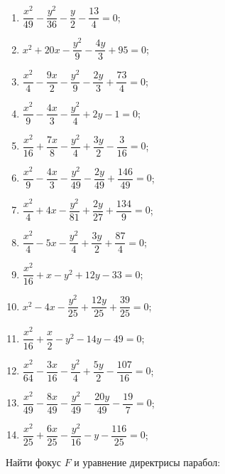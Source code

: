 	\begin{multicols}{2}
		\begin{enumerate}
			\setcounter{enumi}{\value{tasks}}

				\item \( \dfrac{x^2}{49} - \dfrac{y^2}{36} - \dfrac{y}{2} - \dfrac{13}{4} = 0 \);
				\item \( x^2 + 20 x - \dfrac{y^2}{9} - \dfrac{4 y}{3} + 95 = 0 \);
				\item \( \dfrac{x^2}{4} - \dfrac{9 x}{2} - \dfrac{y^2}{9} - \dfrac{2 y}{3} + \dfrac{73}{4} = 0 \);
				\item \( \dfrac{x^2}{9} - \dfrac{4 x}{3} - \dfrac{y^2}{4} + 2 y - 1 = 0 \);
				\item \( \dfrac{x^2}{16} + \dfrac{7 x}{8} - \dfrac{y^2}{4} + \dfrac{3 y}{2} - \dfrac{3}{16} = 0 \);
				\item \( \dfrac{x^2}{9} - \dfrac{4 x}{3} - \dfrac{y^2}{49} - \dfrac{2 y}{49} + \dfrac{146}{49} = 0 \);
				\item \( \dfrac{x^2}{4} + 4 x - \dfrac{y^2}{81} + \dfrac{2 y}{27} + \dfrac{134}{9} = 0 \);
				\item \( \dfrac{x^2}{4} - 5 x - \dfrac{y^2}{4} + \dfrac{3 y}{2} + \dfrac{87}{4} = 0 \);
				\item \( \dfrac{x^2}{16} + x - y^2 + 12 y - 33 = 0 \);
				\item \( x^2 - 4 x - \dfrac{y^2}{25} + \dfrac{12 y}{25} + \dfrac{39}{25} = 0 \);
				\item \( \dfrac{x^2}{16} + \dfrac{x}{2} - y^2 - 14 y - 49 = 0 \);
				\item \( \dfrac{x^2}{64} - \dfrac{3 x}{16} - \dfrac{y^2}{4} + \dfrac{5 y}{2} - \dfrac{107}{16} = 0 \);
				\item \( \dfrac{x^2}{49} - \dfrac{8 x}{49} - \dfrac{y^2}{49} - \dfrac{20 y}{49} - \dfrac{19}{7} = 0 \);
				\item \( \dfrac{x^2}{25} + \dfrac{6 x}{25} - \dfrac{y^2}{16} - y - \dfrac{116}{25} = 0 \);

			\setcounter{tasks}{\value{enumi}}
		\end{enumerate}
	\end{multicols}

	\vspace{15pt}
	Найти фокус $F$ и уравнение директрисы парабол:
	
